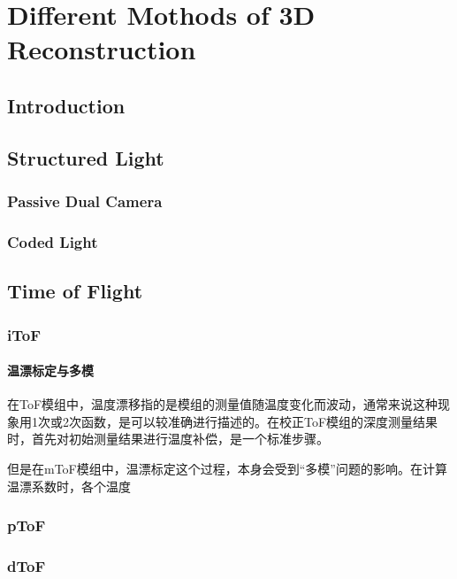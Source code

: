  

\chapter[Reconstruction the 3D world]{Different Mothods of 3D Reconstruction}

\section{Introduction}
\section{Structured Light}
\subsection{Passive Dual Camera}
\subsection{Coded Light}
\section{Time of Flight}
\subsection{iToF}
\subsubsection{温漂标定与多模}
在ToF模组中，温度漂移指的是模组的测量值随温度变化而波动，通常来说这种现象用1次或2次函数，是可以较准确进行描述的。在校正ToF模组的深度测量结果时，首先对初始测量结果进行温度补偿，是一个标准步骤。\par
但是在mToF模组中，温漂标定这个过程，本身会受到“多模”问题的影响。在计算温漂系数时，各个温度
\subsection{pToF}
\subsection{dToF}

